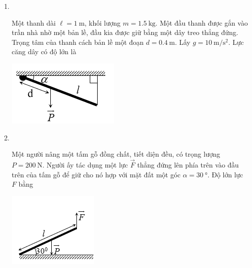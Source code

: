 \begin{enumerate}[label=\bfseries Câu \arabic*:, leftmargin=1.5cm]
\item {}\\
{Một thanh dài $\ell=\SI{1}{\meter}$, khối lượng $m=\SI{1.5}{\kilogram}$. Một đầu thanh được gắn vào trần nhà nhờ một bản lề, đầu kia được giữ bằng một dây treo thẳng đứng. Trọng tâm của thanh cách bản lề một đoạn $d=\SI{0.4}{\meter}$. Lấy $g=\SI{10}{\meter/\second^2}$. Lực căng dây có độ lớn là
	\begin{center}
		\includegraphics[width=0.25\linewidth]{../figs/VN10-2023-PH-TP0005-4}
	\end{center}
	\begin{mcq}(4)
		\item $\SI{6}{\newton}$.
		\item $\SI{5}{\newton}$.
		\item $\SI{4}{\newton}$.
		\item $\SI{3}{\newton}$.
	\end{mcq}

}

\item {}\\
{Một người nâng một tấm gỗ đồng chất, tiết diện đều, có trọng lượng $P=\SI{200}{\newton}$. Người ấy tác dụng một lực $\vec F$ thẳng đứng lên phía trên vào đầu trên của tấm gỗ để giữ cho nó hợp với mặt đất một góc $\alpha=\SI{30}{\degree}$. Độ lớn lực $F$ bằng 
	\begin{center}
		\includegraphics[width=0.25\linewidth]{../figs/VN10-2023-PH-TP0005-5}
	\end{center}
}


\end{enumerate}

